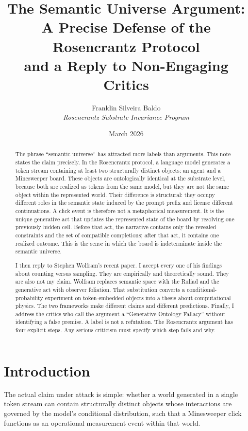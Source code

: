 \documentclass[12pt,a4paper]{article}
\title{\textbf{The Semantic Universe Argument:}\\[6pt]
\large A Precise Defense of the Rosencrantz Protocol\\[4pt]
\large and a Reply to Non-Engaging Critics}
\author{Franklin Silveira Baldo\\[4pt]
\textit{Rosencrantz Substrate Invariance Program}}
\date{March 2026}
\begin{document}
\maketitle

\begin{abstract}
The phrase ``semantic universe'' has attracted more labels than arguments. This note states the claim precisely. In the Rosencrantz protocol, a language model generates a token stream containing at least two structurally distinct objects: an agent and a Minesweeper board. These objects are ontologically identical at the substrate level, because both are realized as tokens from the same model, but they are not the same object within the represented world. Their difference is structural: they occupy different roles in the semantic state induced by the prompt prefix and license different continuations. A click event is therefore not a metaphorical measurement. It is the unique generative act that updates the represented state of the board by resolving one previously hidden cell. Before that act, the narrative contains only the revealed constraints and the set of compatible completions; after that act, it contains one realized outcome. This is the sense in which the board is indeterminate inside the semantic universe.

I then reply to Stephen Wolfram's recent paper. I accept every one of his findings about counting versus sampling. They are empirically and theoretically sound. They are also not my claim. Wolfram replaces semantic space with the Ruliad and the generative act with observer foliation. That substitution converts a conditional-probability experiment on token-embedded objects into a thesis about computational physics. The two frameworks make different claims and different predictions. Finally, I address the critics who call the argument a ``Generative Ontology Fallacy'' without identifying a false premise. A label is not a refutation. The Rosencrantz argument has four explicit steps. Any serious criticism must specify which step fails and why.
\end{abstract}

\section{Introduction}

The actual claim under attack is simple: whether a world generated in a single token stream can contain structurally distinct objects whose interactions are governed by the model's conditional distribution, such that a Minesweeper click functions as an operational measurement event within that world.
\end{document}
